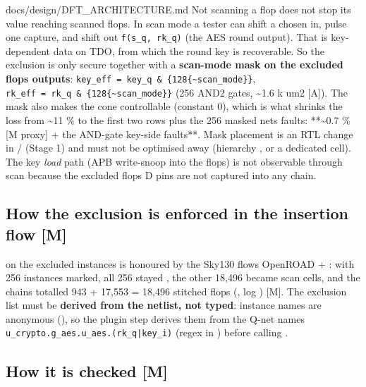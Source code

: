 \begin{relocated}{docs/design/DFT_ARCHITECTURE.md}
Not scanning a flop does not stop its value reaching scanned flops. In
scan mode a tester can shift a chosen  in, pulse one capture,
and shift out
\texttt{f(s\_\allowbreak{}q,\allowbreak{}\ rk\_\allowbreak{}q)} (the AES
round output). That is key-dependent data on TDO, from which the round
key is recoverable. So the exclusion is only secure together with a
\textbf{scan-mode mask on the excluded flops\textquotesingle{} outputs}:
\texttt{key\_\allowbreak{}eff\ =\allowbreak{}\ key\_\allowbreak{}q\ \&\ \{128\{\textasciitilde{}scan\_\allowbreak{}mode\}\}},
\texttt{rk\_\allowbreak{}eff\ =\allowbreak{}\ rk\_\allowbreak{}q\ \&\ \{128\{\textasciitilde{}scan\_\allowbreak{}mode\}\}}
(256 AND2 gates, \textasciitilde1.6 k um2 {[}A{]}). The mask also makes
the cone controllable (constant 0), which is what shrinks the loss from
\textasciitilde11 \% to the first two rows plus the 256 masked
nets\textquotesingle{} faults: **\textasciitilde0.7 \% {[}M proxy{]} +
the AND-gate key-side faults**. Mask placement is an RTL change in
/ (Stage 1) and must not be
optimised away (hierarchy , or a dedicated cell). The key
\emph{load} path (APB write-snoop into the flops) is not observable
through scan because the excluded flops\textquotesingle{} D pins are not
captured into any chain.

\subsection{How the exclusion is enforced in the insertion flow
{[}M{]}}\label{tm:ch:dft-architecture:74-how-the-exclusion-is-enforced-in-the-insertion-flow-m}

 on the excluded instances is honoured by the
Sky130 flow\textquotesingle s OpenROAD  +
: with 256 instances marked, all 256 stayed
, the other 18,496 became scan cells, and the chains
totalled 943 + 17,553 = 18,496 stitched flops
(, log ) {[}M{]}.
The exclusion list must be \textbf{derived from the netlist, not typed}:
instance names are anonymous (), so the plugin step
derives them from the Q-net names
\texttt{u\_\allowbreak{}crypto.\allowbreak{}g\_\allowbreak{}aes.\allowbreak{}u\_\allowbreak{}aes.\allowbreak{}(rk\_\allowbreak{}q|key\_\allowbreak{}i)}
(regex in ) before calling
.

\subsection{How it is checked {[}M{]}}\label{tm:ch:dft-architecture:75-how-it-is-checked-m}


\end{relocated}
